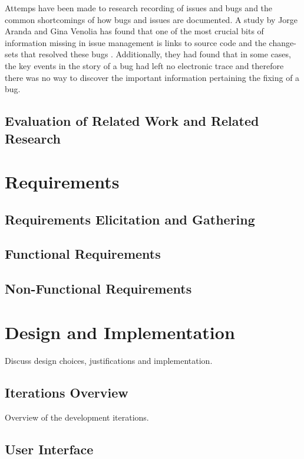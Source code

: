 \documentclass{4thYearProject}
\begin{document}
Attemps have been made to research recording of issues and bugs and the common shortcomings of how bugs and issues are documented. A study by Jorge Aranda and Gina Venolia has found that one of the most crucial bits of information missing in issue management is links to source code and the change-sets that resolved these bugs \cite{lifeofbugs}. Additionally, they had found that in some cases, the key events in the story of a bug had left no electronic trace and therefore there was no way to discover the important information pertaining the fixing of a bug.

\section{Evaluation of Related Work and Related Research}

\chapter{Requirements}

\section{Requirements Elicitation and Gathering}


\section{Functional Requirements}

\newpage
\section{Non-Functional Requirements}

\chapter{Design and Implementation}

Discuss design choices, justifications and implementation.

\section{Iterations Overview}

Overview of the development iterations.

\section{User Interface}
\end{document}
